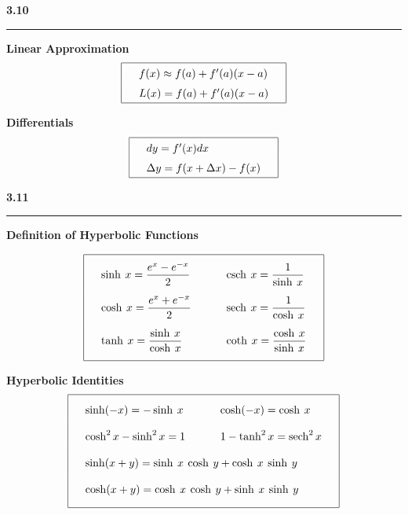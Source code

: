 \documentclass{article}
\DeclareMathOperator{\sech}{sech}
\DeclareMathOperator{\csch}{csch}
\begin{document}
\begin{center}
\Large\textbf{3.10}

\noindent\hfill\rule{0.3\textwidth}{.4pt}\hfill
\vspace{12pt}


\large\textbf{Linear Approximation}
\[\arraycolsep=16pt\def\arraystretch{1.5}
\begin{array}{| l |}
	\hline
	f(x) \approx f(a) + f'(a)(x-a) \\
	L(x) = f(a) + f'(a)(x-a) \\
	\hline
\end{array}
\]
\vspace{12pt}

\large\textbf{Differentials}
\[\arraycolsep=16pt\def\arraystretch{1.5}
\begin{array}{| l |}
	\hline
	dy = f'(x)dx \\
	\Delta y = f(x + \Delta x) - f(x) \\
	\hline
\end{array}
\]
\end{center}
\vspace{16pt}

\begin{center}
\Large\textbf{3.11}

\noindent\hfill\rule{0.3\textwidth}{.4pt}\hfill
\vspace{12pt}

\large\textbf{Definition of Hyperbolic Functions}
\begin{large}
\[\arraycolsep=16pt\def\arraystretch{2.5}
\begin{array}{| l l |}
	\hline
	\sinh\> x = \dfrac{e^x - e^{-x}}{2} & \csch\> x = \dfrac{1}{\sinh\> x} \\
	\cosh\> x = \dfrac{e^x + e^{-x}}{2} & \sech\> x = \dfrac{1}{\cosh\> x} \\
	\tanh\> x = \dfrac{\sinh\> x}{\cosh\> x} & \coth\> x = \dfrac{\cosh\> x}{\sinh\> x} \\
	[\medskipamount]	
	\hline
\end{array}
\]
\vspace{12pt}

\large\textbf{Hyperbolic Identities}
\[\arraycolsep=16pt\def\arraystretch{2}
\begin{array}{| l l |}
	\hline
	\sinh(-x) = -\sinh\> x & \cosh(-x) = \cosh\> x \\
	\cosh^2x - \sinh^2 x = 1 & 1 - \tanh^2x = \sech^2 x \\
	\multicolumn{2}{|l|} {\sinh(x+y) = \sinh\> x \> \cosh\> y +\cosh\> x \> \sinh\> y} \\
	\multicolumn{2}{|l|} {\cosh(x+y) = \cosh\> x \> \cosh\> y +\sinh\> x \> \sinh\> y} \\
	[\medskipamount]	
	\hline
\end{array}
\]
\end{large}
\end{center}
\pagebreak
\end{document}
